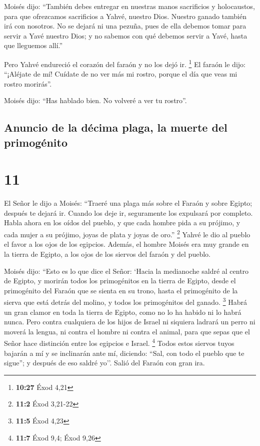  Moisés dijo: ``También debes entregar en nuestras manos
sacrificios y holocaustos, para que ofrezcamos sacrificios a Yahvé,
nuestro Dios.  Nuestro ganado también irá con nosotros.
No se dejará ni una pezuña, pues de ella debemos tomar para servir a
Yavé nuestro Dios; y no sabemos con qué debemos servir a Yavé, hasta que
lleguemos allí.''

 Pero Yahvé endureció el corazón del faraón y no los dejó
ir. \footnote{\textbf{10:27} Éxod 4,21}  El faraón le
dijo: ``¡Aléjate de mí! Cuídate de no ver más mi rostro, porque el día
que veas mi rostro morirás''.

 Moisés dijo: ``Has hablado bien. No volveré a ver tu
rostro''.

\hypertarget{anuncio-de-la-duxe9cima-plaga-la-muerte-del-primoguxe9nito}{%
\subsection{Anuncio de la décima plaga, la muerte del
primogénito}\label{anuncio-de-la-duxe9cima-plaga-la-muerte-del-primoguxe9nito}}

\hypertarget{section-10}{%
\section{11}\label{section-10}}

 El Señor le dijo a Moisés: ``Traeré una plaga más sobre
el Faraón y sobre Egipto; después te dejará ir. Cuando los deje ir,
seguramente los expulsará por completo.  Habla ahora en
los oídos del pueblo, y que cada hombre pida a su prójimo, y cada mujer
a su prójimo, joyas de plata y joyas de oro.'' \footnote{\textbf{11:2}
  Éxod 3,21-22}  Yahvé le dio al pueblo el favor a los
ojos de los egipcios. Además, el hombre Moisés era muy grande en la
tierra de Egipto, a los ojos de los siervos del faraón y del pueblo.

 Moisés dijo: ``Esto es lo que dice el Señor: `Hacia la
medianoche saldré al centro de Egipto,  y morirán todos
los primogénitos en la tierra de Egipto, desde el primogénito del Faraón
que se sienta en su trono, hasta el primogénito de la sierva que está
detrás del molino, y todos los primogénitos del ganado. \footnote{\textbf{11:5}
  Éxod 4,23}  Habrá un gran clamor en toda la tierra de
Egipto, como no lo ha habido ni lo habrá nunca.  Pero
contra cualquiera de los hijos de Israel ni siquiera ladrará un perro ni
moverá la lengua, ni contra el hombre ni contra el animal, para que
sepas que el Señor hace distinción entre los egipcios e Israel.
\footnote{\textbf{11:7} Éxod 9,4; Éxod 9,26}  Todos estos
siervos tuyos bajarán a mí y se inclinarán ante mí, diciendo: ``Sal, con
todo el pueblo que te sigue''; y después de eso saldré yo''. Salió del
Faraón con gran ira.

